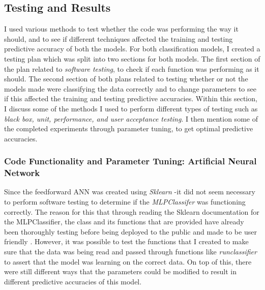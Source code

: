 \documentclass[11pt]{article}
\begin{document}
\subsection{Testing and Results}\label{subsec:TnR}
I used various methods to test whether the code was performing the way it should, and to see if different techniques affected the training and testing predictive accuracy of both the models. For both classification models, I created a testing plan which was split into two sections for both models. The first section of the plan related to \textit{software testing}, to check if each function was performing as it should. The second section of both plans related to testing whether or not the models made were classifying the data correctly and to change parameters to see if this affected the training and testing predictive accuracies. Within this section, I discuss some of the methods I used to perform different types of testing such as \textit{black box, unit, performance, and user acceptance testing}. I then mention some of the completed experiments through parameter tuning, to get optimal predictive accuracies. 
\subsubsection{Code Functionality and Parameter Tuning: Artificial Neural Network}\label{subsubsec:CFPT}
Since the feedforward ANN was created using \textit{Sklearn} -it did not seem necessary to perform software testing to determine if the \textit{MLPClassifer} was functioning correctly. The reason for this that through reading the Sklearn documentation for the MLPClassifier, the class and its functions that are provided have already been thoroughly testing before being deployed to the public and made to be user friendly \cite{?}. However, it was possible to test the functions that I created to make sure that the data was being read and passed through functions like \textit{run\textunderscore classifier} to assert that the model was learning on the correct data. On top of this, there were still different ways that the parameters could be modified to result in different predictive accuracies of this model. 
\end{document}
